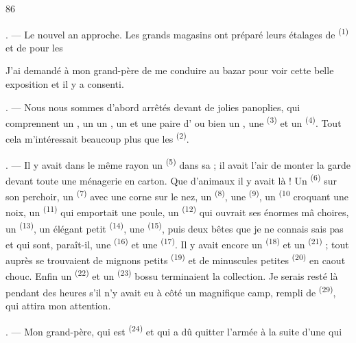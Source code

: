 \begin{VUpage}[88]{86}
\VUsaut{6.0mm}
\VUsaut{1.4mm}
\VUsaut{2.2mm}

. --- Le nouvel an approche. Les grands magasins\nl
ont préparé leurs étalages de \textsuperscript{(1)} et de \nl
pour les 

\VUblancAlinea
J'ai demandé à mon grand-père de me conduire au\nl
bazar pour voir cette belle exposition et il y a consenti.

. --- Nous nous sommes d'abord arrêtés devant de\nl
jolies panoplies, qui comprennent un , un \nl
un , un  et une paire d'\nl
ou bien un , une \textsuperscript{(3)} et un \cc
{}\textsuperscript{(4)}. Tout cela m'intéressait beaucoup plus que\nl
les \textsuperscript{(2)}.

. --- Il y avait dans le même rayon un \cc
{}\textsuperscript{(5)} dans sa  ; il avait l'air de monter\nl
la garde devant toute une ménagerie en carton. Que\nl
d'animaux il y avait là ! Un \textsuperscript{(6)} sur son\nl
perchoir, un \textsuperscript{(7)} avec une corne sur le\nl
nez, un \textsuperscript{(8)}, une \textsuperscript{(9)}, un \textsuperscript{(10}\nl
croquant une noix, un \textsuperscript{(11)} qui emportait une\nl
poule, un \textsuperscript{(12)} qui ouvrait ses énormes mâ\cc
choires, un \textsuperscript{(13)}, un élégant petit \textsuperscript{(14)},\nl
une \textsuperscript{(15)}, puis deux bêtes que je ne connais\cc
sais pas et qui sont, paraît-il, une \textsuperscript{(16)} et une\nl
{}\textsuperscript{(17)}. Il y avait encore un \textsuperscript{(18)} et un\nl
{}\textsuperscript{(21)} ; tout auprès se trouvaient de mignons petits\nl
{}\textsuperscript{(19)} et de minuscules petites \textsuperscript{(20)} en caout\cc
chouc. Enfin un \textsuperscript{(22)} et un \cc
{}\textsuperscript{(23)} bossu terminaient la collection. Je serais\nl
resté là pendant des heures s'il n'y avait eu à côté un\nl
magnifique camp, rempli de \textsuperscript{(29)},\nl
qui attira mon attention.

. --- Mon grand-père, qui est \textsuperscript{(24)} et qui\nl
a dû quitter l'armée à la suite d'une  qui
\parplein
\end{VUpage}

